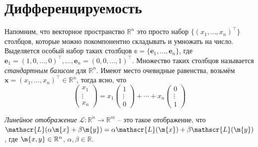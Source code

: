 \section{Дифференцируемость}

Напомним, что векторное пространство $\mathbb{R}^n$ это просто набор $\{(x_1,\ldots, x_n)^\top\}$ столбцов, которые можно покомпонентно складывать и умножать на число. Выделяется особый набор таких столбцов $\mathbb{e} = \{\mathbf{e}_1, \ldots, \mathbf{e}_n\}$, где $\mathbf{e}_1 = (1,0, \ldots, 0)^\top, \ldots, \mathbf{e}_n = (0,0,\ldots, 1)^\top$. Множество таких столбцов называется \textit{стандартным базисом} для $\mathbb{R}^n$. Имеют место очевидные равенства, возьмём $\mathbf{x} = (x_1,\ldots, x_n)^\top \in \mathbb{R}^n$, тогда ясно, что 
\[
\begin{pmatrix}
    x_1 \\ \vdots \\x_n 
\end{pmatrix} = x_1 \begin{pmatrix}
    1 \\ \vdots \\ 0
\end{pmatrix} + \cdots + x_n \begin{pmatrix}
    0 \\ \vdots \\1
\end{pmatrix}
\]

\textit{Линейное отображение} $\mathscr{L}:\mathbb{R}^n \to \mathbb{R}^m$ -- это такое отображение, что $\mathscr{L}(\alpha \m{x} +\beta \m{y} ) = \alpha \mathscr{L}(\m{x}) +\beta \mathscr{L}(\m{y})$, где $\m{x,y} \in \mathbb{R}^n$, $\alpha, \beta \in \mathbb{R}.$ 

